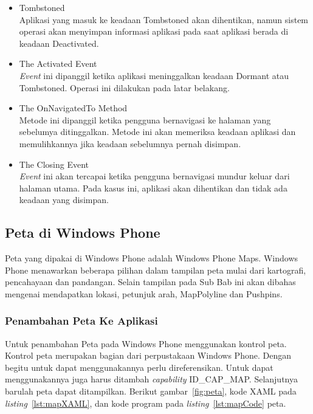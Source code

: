 \begin{itemize}
	\item Tombstoned \\
	Aplikasi yang masuk ke keadaan Tombstoned akan dihentikan, namun sistem operasi akan menyimpan informasi aplikasi pada saat aplikasi berada di keadaan Deactivated.
	\item The Activated Event \\
	\textit{Event} ini dipanggil ketika aplikasi meninggalkan keadaan Dormant atau Tombstoned. Operasi ini dilakukan pada latar belakang. 
	\item The OnNavigatedTo Method \\
	Metode ini dipanggil ketika pengguna bernavigasi ke halaman yang sebelumya ditinggalkan. Metode ini akan memeriksa keadaan aplikasi dan memulihkannya jika keadaan sebelumnya pernah disimpan. 
	\item The Closing Event \\
	\textit{Event} ini akan tercapai ketika pengguna bernavigasi mundur keluar dari halaman utama. Pada kasus ini, aplikasi akan dihentikan dan tidak ada keadaan yang disimpan. 
\end{itemize}

\subsection{Peta di Windows Phone}
\label{subsec:Peta di Windows Phone}
\hspace{0.5cm} Peta yang dipakai di Windows Phone adalah Windows Phone Maps. Windows Phone menawarkan beberapa pilihan dalam tampilan peta mulai dari kartografi, pencahayaan dan pandangan. Selain tampilan pada Sub Bab ini akan dibahas mengenai mendapatkan lokasi, petunjuk arah, MapPolyline dan Pushpins.

\subsubsection{Penambahan Peta Ke Aplikasi}
\label{subsubsec:Penambahan Peta Ke Aplikasi}
\hspace{0.5cm} Untuk penambahan Peta pada Windows Phone menggunakan kontrol peta. Kontrol peta merupakan bagian dari perpustakaan Windows Phone. Dengan begitu untuk dapat menggunakannya perlu direferensikan. Untuk dapat menggunakannya juga harus ditambah \textit{capability} ID\_CAP\_MAP. Selanjutnya barulah peta dapat ditampilkan. Berikut gambar~\ref{fig:peta}, kode XAML pada \textit{listing}~\ref{lst:mapXAML}, dan kode program pada \textit{listing}~\ref{lst:mapCode} peta.

